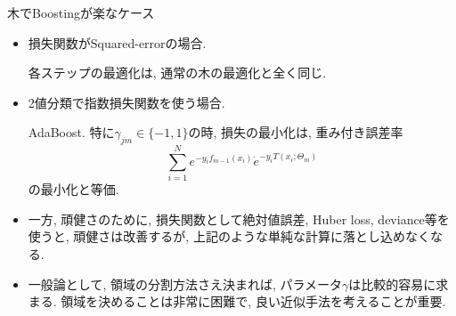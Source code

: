 \documentclass[dvipdfmx,8pt]{beamer}
\begin{document}
  \begin{frame}{木でBoostingが楽なケース}
    \begin{itemize}
      \item 損失関数がSquared-errorの場合.

      各ステップの最適化は, 通常の木の最適化と全く同じ.

      \item 2値分類で指数損失関数を使う場合.

      AdaBoost. 特に$\gamma_{jm} \in \{-1,1\}$の時, 損失の最小化は, 重み付き誤差率
      \[
        \sum_{i=1}^{N}e^{-y_if_{m-1}(x_i)}\dot e^{-y_iT(x_i;\Theta_m)}
      \]
      の最小化と等価.

      \item 一方, 頑健さのために, 損失関数として絶対値誤差, Huber loss, deviance等を使うと, 頑健さは改善するが, 上記のような単純な計算に落とし込めなくなる.

      \item 一般論として, 領域の分割方法さえ決まれば, パラメータ$\gamma$は比較的容易に求まる. 領域を決めることは非常に困難で, 良い近似手法を考えることが重要.
    \end{itemize}
  \end{frame}
\end{document}
